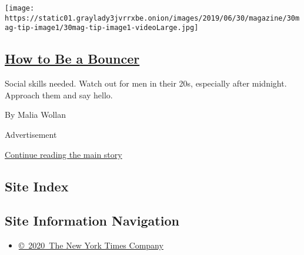 \begin{enumerate}
  \texttt{[image: https://static01.graylady3jvrrxbe.onion/images/2019/06/30/magazine/30mag-tip-image1/30mag-tip-image1-videoLarge.jpg]}

  \hypertarget{how-to-be-a-bouncer}{%
  \subsection{\texorpdfstring{\href{/2019/06/25/magazine/how-to-be-a-bouncer-tip.html}{How
  to Be a Bouncer}}{How to Be a Bouncer}}\label{how-to-be-a-bouncer}}

  Social skills needed. Watch out for men in their 20s, especially after
  midnight. Approach them and say hello.

  By Malia Wollan
\end{enumerate}

Advertisement

\protect\hyperlink{after-mid1}{Continue reading the main story}

\hypertarget{site-index}{%
\subsection{Site Index}\label{site-index}}

\hypertarget{site-information-navigation}{%
\subsection{Site Information
Navigation}\label{site-information-navigation}}

\begin{itemize}
\tightlist
\item
  \href{https://help.nytimes3xbfgragh.onion/hc/en-us/articles/115014792127-Copyright-notice}{©~2020~The
  New York Times Company}
\end{itemize}

